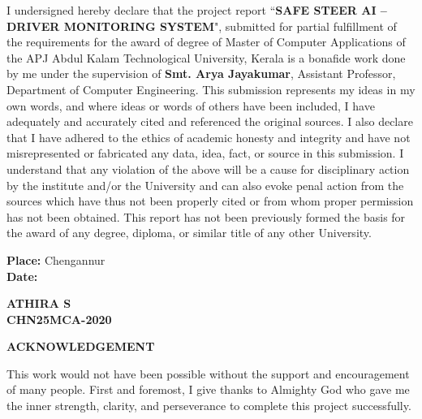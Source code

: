 \documentclass[a4paper,12pt]{report}
\begin{document}
\noindent I undersigned hereby declare that the project report “\textbf{SAFE STEER AI -- DRIVER MONITORING SYSTEM}", submitted for partial fulfillment of the requirements for the award of degree of Master of Computer Applications of the APJ Abdul Kalam Technological University, Kerala is a bonafide work done by me under the supervision of \textbf{Smt. Arya Jayakumar}, Assistant Professor, Department of Computer Engineering. This submission represents my ideas in my own words, and where ideas or words of others have been included, I have adequately and accurately cited and referenced the original sources. I also declare that I have adhered to the ethics of academic honesty and integrity and have not misrepresented or fabricated any data, idea, fact, or source in this submission. I understand that any violation of the above will be a cause for disciplinary action by the institute and/or the University and can also evoke penal action from the sources which have thus not been properly cited or from whom proper permission has not been obtained. This report has not been previously formed the basis for the award of any degree, diploma, or similar title of any other University.

\vspace{3.5cm}

\noindent\begin{minipage}{0.45\linewidth}
\begin{flushleft}
\textbf{Place:} Chengannur \\
\textbf{Date:} 
\end{flushleft} 
\end{minipage}
\hfill
\begin{minipage}{0.45\linewidth}
\begin{flushright}
\textbf{ATHIRA S}\\
\textbf{CHN25MCA-2020}\\
\end{flushright} 
\end{minipage}

\clearpage

\begin{center}
 \Large {\bf \uppercase{Acknowledgement}}
\end{center}

\vspace{1.5cm}

\noindent This work would not have been possible without the support and encouragement of many people. First and foremost, I give thanks to Almighty God who gave me the inner strength, clarity, and perseverance to complete this project successfully.
\end{document}
